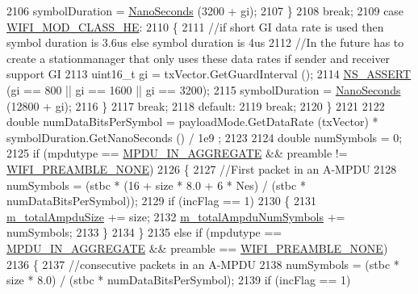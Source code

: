 \begin{DoxyCode}
2106         symbolDuration = \hyperlink{group__timecivil_ga281d64bcb4dad96267d83c7688ec433f}{NanoSeconds} (3200 + gi);
2107       \}
2108       \textcolor{keywordflow}{break};
2109     \textcolor{keywordflow}{case} \hyperlink{namespacens3_aa999e1221606a2b21b1eb33c2007c217abfa4f7272510045a9b43e8ac27ac13b0}{WIFI\_MOD\_CLASS\_HE}:
2110       \{
2111         \textcolor{comment}{//if short GI data rate is used then symbol duration is 3.6us else symbol duration is 4us}
2112         \textcolor{comment}{//In the future has to create a stationmanager that only uses these data rates if sender and
       receiver support GI}
2113         uint16\_t gi = txVector.GetGuardInterval ();
2114         \hyperlink{assert_8h_a6dccdb0de9b252f60088ce281c49d052}{NS\_ASSERT} (gi == 800 || gi == 1600 || gi == 3200);
2115         symbolDuration = \hyperlink{group__timecivil_ga281d64bcb4dad96267d83c7688ec433f}{NanoSeconds} (12800 + gi);
2116       \}
2117       \textcolor{keywordflow}{break};
2118     \textcolor{keywordflow}{default}:
2119       \textcolor{keywordflow}{break};
2120     \}
2121 
2122   \textcolor{keywordtype}{double} numDataBitsPerSymbol = payloadMode.GetDataRate (txVector) * symbolDuration.GetNanoSeconds () / 1e9
      ;
2123 
2124   \textcolor{keywordtype}{double} numSymbols = 0;
2125   \textcolor{keywordflow}{if} (mpdutype == \hyperlink{namespacens3_ae617d41bbd0c07fa58ee2306f687b055ac78adeb4fa20b2eefca65601b0b38625}{MPDU\_IN\_AGGREGATE} && preamble != 
      \hyperlink{group__wifi_gga5e94a56cb338a14ffbbb19c6a41251eba97c5c71995de5f28931200e6d5a38a66}{WIFI\_PREAMBLE\_NONE})
2126     \{
2127       \textcolor{comment}{//First packet in an A-MPDU}
2128       numSymbols = (stbc * (16 + size * 8.0 + 6 * Nes) / (stbc * numDataBitsPerSymbol));
2129       \textcolor{keywordflow}{if} (incFlag == 1)
2130         \{
2131           \hyperlink{classns3_1_1WifiPhy_a33881bc9adbd2f0fa397fa6d5a44365f}{m\_totalAmpduSize} += size;
2132           \hyperlink{classns3_1_1WifiPhy_aef81821222be314fe60d1b1827b1397f}{m\_totalAmpduNumSymbols} += numSymbols;
2133         \}
2134     \}
2135   \textcolor{keywordflow}{else} \textcolor{keywordflow}{if} (mpdutype == \hyperlink{namespacens3_ae617d41bbd0c07fa58ee2306f687b055ac78adeb4fa20b2eefca65601b0b38625}{MPDU\_IN\_AGGREGATE} && preamble == 
      \hyperlink{group__wifi_gga5e94a56cb338a14ffbbb19c6a41251eba97c5c71995de5f28931200e6d5a38a66}{WIFI\_PREAMBLE\_NONE})
2136     \{
2137       \textcolor{comment}{//consecutive packets in an A-MPDU}
2138       numSymbols = (stbc * size * 8.0) / (stbc * numDataBitsPerSymbol);
2139       \textcolor{keywordflow}{if} (incFlag == 1)

\end{DoxyCode}
